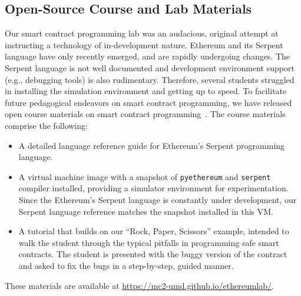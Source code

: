 \documentclass{llncs}
\newcommand{\elaine}[1]{}
\begin{document}
\subsection{Open-Source Course and Lab Materials}
Our smart contract programming lab was an audacious, 
original attempt 
at instructing a technology of in-development nature.
Ethereum and its Serpent language
have only recently emerged, and are 
rapidly undergoing changes. 
The Serpent language is not well documented and development
environment support (e.g., debugging tools) 
is also rudimentary.
Therefore, several students struggled 
in installing the simulation environment and 
getting up to speed.
%
To facilitate future pedagogical endeavors on smart contract programming,
we have released open course materials on smart contract programming~\cite{anonymousethlab}.
%
The course materials comprise the following:
\vspace{-10pt}
\begin{itemize}[leftmargin=5mm]
\item
A detailed language reference 
guide for Ethereum's Serpent programming language.
\item
A virtual machine image with a snapshot of {\tt pyethereum} and {\tt serpent} compiler installed,
providing a simulator environment for experimentation.
Since the Ethereum's Serpent language is constantly
under development, our Serpent language
reference matches the snapshot installed in this VM. 
\item
A tutorial that 
builds on our ``Rock, Paper, Scissors'' example, 
intended to 
walk the student through the typical pitfalls
in programming safe smart contracts.
The student is presented with the buggy version of the contract
and asked to fix the bugs in a step-by-step, guided manner.
\end{itemize}
\vspace{-10pt}
These materials are available at \url{https://mc2-umd.github.io/ethereumlab/}.
\end{document}
